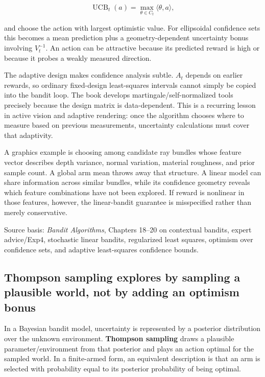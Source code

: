 \[
\operatorname{UCB}_t(a)
=
\max_{\theta\in C_t}
\langle\theta,a\rangle,
\]

and choose the action with largest optimistic value. For ellipsoidal confidence sets this becomes a mean prediction plus a geometry-dependent uncertainty bonus involving \(V_t^{-1}\). An action can be attractive because its predicted reward is high or because it probes a weakly measured direction.

The adaptive design makes confidence analysis subtle. \(A_t\) depends on earlier rewards, so ordinary fixed-design least-squares intervals cannot simply be copied into the bandit loop. The book develops martingale/self-normalized tools precisely because the design matrix is data-dependent. This is a recurring lesson in active vision and adaptive rendering: once the algorithm chooses where to measure based on previous measurements, uncertainty calculations must cover that adaptivity.

A graphics example is choosing among candidate ray bundles whose feature vector describes depth variance, normal variation, material roughness, and prior sample count. A global arm mean throws away that structure. A linear model can share information across similar bundles, while its confidence geometry reveals which feature combinations have not been explored. If reward is nonlinear in those features, however, the linear-bandit guarantee is misspecified rather than merely conservative.

Source basis: \emph{Bandit Algorithms}, Chapters 18--20 on contextual bandits, expert advice/Exp4, stochastic linear bandits, regularized least squares, optimism over confidence sets, and adaptive least-squares confidence bounds.

\subsection{Thompson sampling explores by sampling a plausible world, not by adding an optimism bonus}\label{02-foundations-ii-ch029-thompson-sampling-explores-by-sampling-a-plausible-world-not-by-adding-an-optimism-bonus}

In a Bayesian bandit model, uncertainty is represented by a posterior distribution over the unknown environment. \textbf{Thompson sampling} draws a plausible parameter/environment from that posterior and plays an action optimal for the sampled world. In a finite-armed form, an equivalent description is that an arm is selected with probability equal to its posterior probability of being optimal.


